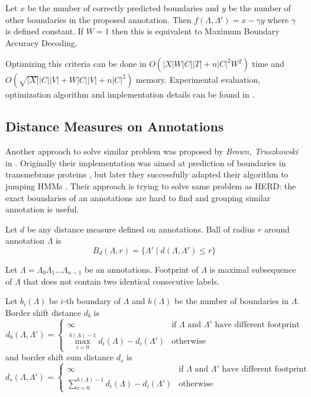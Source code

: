 Let $x$ be the number of correctly
predicted boundaries and $y$ be the number of other boundaries in the proposed
annotation. Then $f(\Lambda,\Lambda')=x-\gamma y$ where $\gamma$ is defined
constant. If $W=1$ then this is equivalent to Maximum Boundary Accuracy
Decoding. 

Optimizing this criteria can be done in $O(|X|W|C||T| + n|C|^2W^2)$ time  and
$O(\sqrt{|X|}|C||V|+W|C||V|+n|C|^2)$ memory. Experimental evaluation,
optimization algorithm and implementation details can be found in
\cite{Nanasi2010mgr}.

\subsection{Distance Measures on Annotations}

Another approach to solve similar problem was proposed by {\it Brown,
Truszkowski} in \cite{Brown2010}. Originally their implementation was aimed at
prediction of boundaries in transmebrane proteins \cite{Brown2010}, but later
they successfully adapted their algorithm to jumping HMMs \cite{Truszkowski2011}.
Their approach is trying to solve same problem as HERD: the exact boundaries of
an annotations are hard to find and grouping similar annotation is useful.

\begin{definition}
Let $d$ be any distance measure defined on annotations. Ball of radius $r$
around annotation $\Lambda$ is 
\begin{equation*}
B_d(\Lambda,r) = \{\Lambda'\mid d(\Lambda,\Lambda')\leq r\}
\end{equation*}
\end{definition}

\begin{definition}
Let $\Lambda=\Lambda_0\Lambda_1\dots\Lambda_{n-1}$ be an annotations. Footprint
of $\Lambda$ is maximal subsequence of $\Lambda$ that does not contain two
identical 
consecutive labels.
\end{definition}

\begin{definition}
Let $b_i(\Lambda)$ be $i$-th boundary of $\Lambda$ and $b(\Lambda)$ be the
number of boundaries in $\Lambda$.
Border shift distance $d_{b}$ is 
\begin{equation*}
d_{b}(\Lambda,\Lambda') = \begin{cases}
\infty & \text{if $\Lambda$ and $\Lambda'$ have different footprint}\\
\max_{i=0}^{b(\Lambda)-1} d_i(\Lambda)-d_i(\Lambda') & \text{otherwise}
\end{cases}
\end{equation*}
and border shift sum distance $d_s$ is 
\begin{equation*}
d_{s}(\Lambda,\Lambda') = \begin{cases}
\infty & \text{if $\Lambda$ and $\Lambda'$ have different footprint}\\
\sum_{i=0}^{b(\Lambda)-1} d_i(\Lambda)-d_i(\Lambda') & \text{otherwise}
\end{cases}
\end{equation*}

\end{definition}

